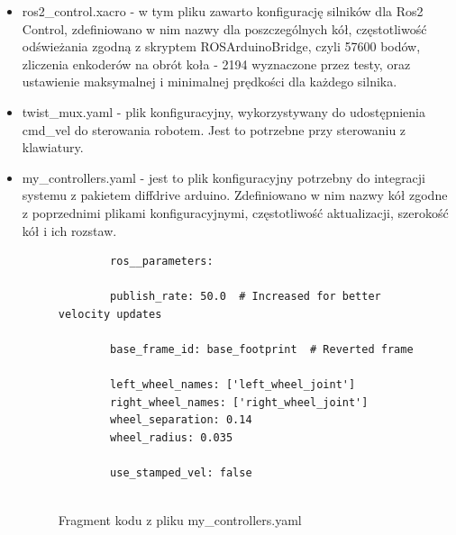 \documentclass[a4paper,twoside,12pt]{book}
\begin{document}
\begin{itemize}
	\item ros2\_control.xacro - w tym pliku zawarto konfigurację silników dla Ros2 Control, zdefiniowano w nim nazwy dla poszczególnych kół, częstotliwość odświeżania zgodną z skryptem ROSArduinoBridge, czyli 57600 bodów, zliczenia enkoderów na obrót koła - 2194 wyznaczone przez testy, oraz ustawienie maksymalnej i minimalnej prędkości dla każdego silnika.
	\item twist\_mux.yaml - plik konfiguracyjny, wykorzystywany do udostępnienia cmd\_vel do sterowania robotem. Jest to potrzebne przy sterowaniu z klawiatury.
	\newpage \item my\_controllers.yaml - jest to plik konfiguracyjny potrzebny do integracji systemu z pakietem diffdrive arduino. Zdefiniowano w nim nazwy kół zgodne z poprzednimi plikami konfiguracyjnymi, częstotliwość aktualizacji, szerokość kół i ich rozstaw.
	\begin{figure}[!hb]
		\centering
	\begin{lstlisting}
		ros__parameters:

		publish_rate: 50.0  # Increased for better velocity updates
	
		base_frame_id: base_footprint  # Reverted frame
	
		left_wheel_names: ['left_wheel_joint']
		right_wheel_names: ['right_wheel_joint']
		wheel_separation: 0.14  
		wheel_radius: 0.035     
	
		use_stamped_vel: false
	
		\end{lstlisting}
		\caption{Fragment kodu z pliku my\_controllers.yaml}
		\label{fig:my-controllers}
	\end{figure}
\end{itemize}
\newpage
\end{document}
